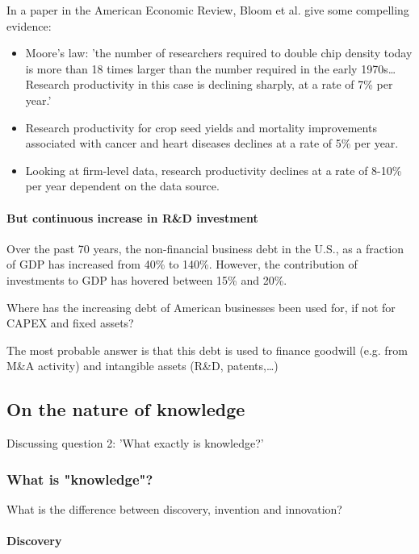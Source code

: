 In a paper in the American Economic Review, Bloom et al. give some compelling
evidence:
\begin{itemize}
    \item Moore's law: 'the number of researchers required to double chip density
        today is more than 18 times larger than the number required in the early
        1970s\dots Research productivity in this case is declining sharply, at
        a rate of 7\% per year.'
    \item Research productivity for crop seed yields and mortality improvements
        associated with cancer and heart diseases declines at a rate of 5\% per
        year.
    \item Looking at firm-level data, research productivity declines at a rate
        of 8-10\% per year dependent on the data source.
\end{itemize}

\paragraph{But continuous increase in R\&D investment}

Over the past 70 years, the non-financial business debt in the U.S., as a
fraction of GDP has increased from 40\% to 140\%. However, the contribution
of investments to GDP has hovered between 15\% and 20\%.

Where has the increasing debt of American businesses been used for, if not
for CAPEX and fixed assets?

The most probable answer is that this debt is used to finance goodwill
(e.g. from M\&A activity) and intangible assets (R\&D, patents,\dots)

\subsection{On the nature of knowledge}

Discussing question 2: 'What exactly is knowledge?'

\subsubsection{What is "knowledge"?}

What is the difference between discovery, invention and innovation?

\paragraph{Discovery}


